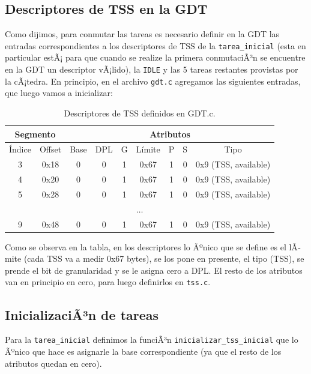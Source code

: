 \documentclass[10pt, a4paper]{article}
\begin{document}
\subsection{Descriptores de TSS en la GDT}
Como dijimos, para conmutar las tareas es necesario definir en la GDT las entradas correspondientes a los descriptores de TSS de la \texttt{tarea\_inicial}
 (esta en particular estÃ¡ para que cuando se realize la primera conmutaciÃ³n se encuentre en la GDT un descriptor vÃ¡lido), la \texttt{IDLE} y las 5 
tareas restantes provistas por la cÃ¡tedra.
En principio, en el archivo \texttt{gdt.c} agregamos las siguientes entradas, que luego vamos a inicializar:
\begin{table}[!h]
\begin{center}
	\begin{tabular}{|c|c|c|c|c|c|c|c|c|}
	\hline
	\multicolumn{2}{|c|}{Segmento}	& \multicolumn{7}{|c|}{Atributos}\\ \hline
	\'Indice &	Offset	& Base 	 & DPL & G & L\'imite & P & S& Tipo  \\ \hline
	3	& 0x18		& 0	         & 0  & 1 & 0x67    & 1 & 0&0x9 (TSS, available) \\ \hline
	4	& 0x20		& 0	         & 0  & 1 & 0x67    & 1 & 0&0x9 (TSS, available) \\ \hline
	5	& 0x28		& 0		 & 0  & 1 & 0x67    & 1 & 0&0x9 (TSS, available) \\ \hline
	\multicolumn{9}{c}{$\dots$}\\ \hline
	9	& 0x48		& 0		 & 0  & 1 & 0x67    & 1 & 0&0x9 (TSS, available) \\ \hline
	\end{tabular}
	\caption{Descriptores de TSS definidos en GDT.c.}
\end{center}
\end{table}
\newpage
Como se observa en la tabla, en los descriptores lo Ãºnico que se define es el lÃ­mite (cada TSS va a medir 0x67 bytes), se los pone en presente, el tipo (TSS), se
prende el bit de granularidad y se le asigna cero a DPL. El resto de los atributos van en principio en cero, para luego definirlos en \texttt{tss.c}.
\subsection{InicializaciÃ³n de tareas}
Para la \texttt{tarea\_inicial} definimos la funciÃ³n \texttt{inicializar\_tss\_inicial} que lo Ãºnico que hace es asignarle la base correspondiente (ya que el resto
de los atributos quedan en cero).
\end{document}

